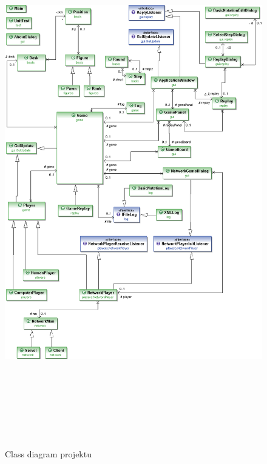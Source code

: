 \documentclass[12pt,a4paper,titlepage,final]{article}
\begin{document}
\begin{figure}[t]
  \centering
  \includegraphics[height=23cm]{img/cd.png}
  \caption{Class diagram projektu}
  \label{fig:cd}
\end{figure}
\end{document}
